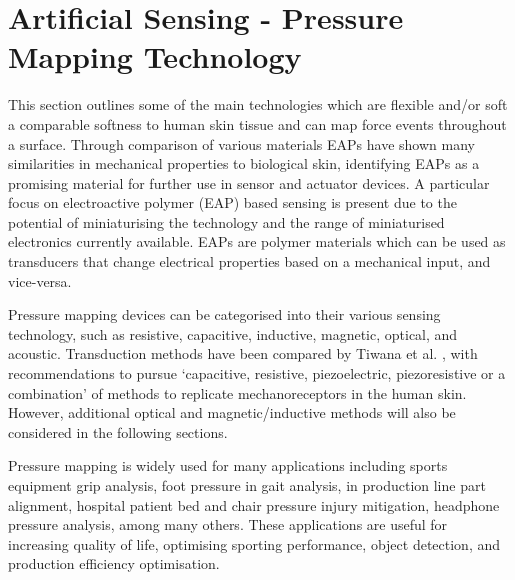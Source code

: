 \section{Artificial Sensing - Pressure Mapping Technology}
This section outlines some of the main technologies which are flexible and/or soft a comparable softness to human skin tissue and can map force events throughout a surface.
Through comparison of various materials EAPs have shown many similarities in mechanical properties to biological skin, identifying EAPs as a promising material for further use in sensor and actuator devices. A particular focus on electroactive polymer (EAP) based sensing is present due to the potential of miniaturising the technology and the range of miniaturised electronics currently available. EAPs are polymer materials which can be used as transducers that change electrical properties based on a mechanical input, and vice-versa.

Pressure mapping devices can be categorised into their various sensing technology, such as resistive, capacitive, inductive, magnetic, optical, and acoustic. Transduction methods have been compared by Tiwana et al. \cite{Tiwana2012}, with recommendations to pursue `capacitive, resistive, piezoelectric, piezoresistive or a combination' of methods to replicate mechanoreceptors in the human skin. However, additional optical and magnetic/inductive methods will also be considered in the following sections.

Pressure mapping is widely used for many applications including sports equipment grip analysis, foot pressure in gait analysis, in production line part alignment, hospital patient bed and chair pressure injury mitigation, headphone pressure analysis, among many others. These applications are useful for increasing quality of life, optimising sporting performance, object detection, and production efficiency optimisation.

